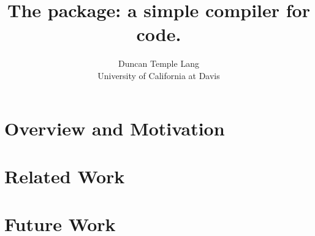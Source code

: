 \documentclass[article]{jss}
\author{Duncan Temple Lang\\University of California at Davis}
\title{The \Rpkg{RLLVMCompile} package: a simple compiler for \R{} code.}
\begin{document}
\section{Overview and Motivation}\label{sec:Introduction}



\section{Related Work}

\section{Future Work}





\end{document}
